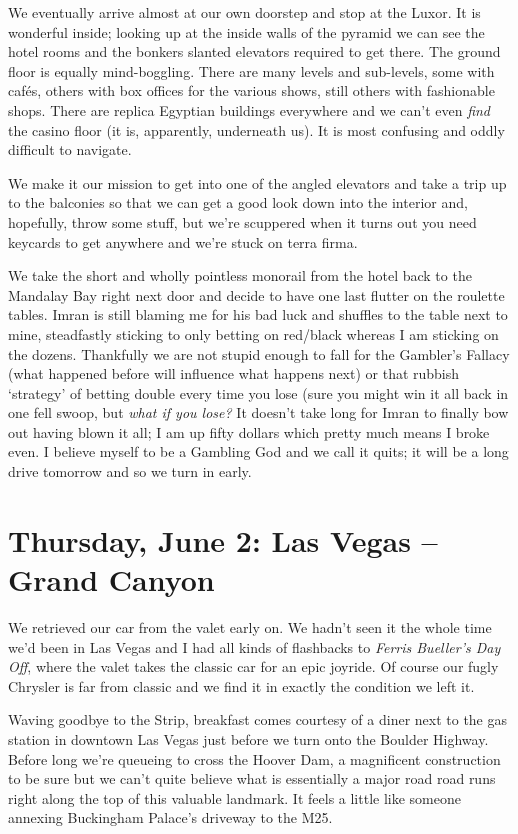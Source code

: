 \documentclass[a5paper,titlepage,11pt]{book}
\begin{document}
We eventually arrive almost at our own doorstep and stop at the Luxor.  It is wonderful inside; looking up at the inside walls of the pyramid we can see the hotel rooms and the bonkers slanted elevators required to get there.  The ground floor is equally mind-boggling.  There are many levels and sub-levels, some with caf\'{e}s, others with box offices for the various shows, still others with fashionable shops.  There are replica Egyptian buildings everywhere and we can't even \emph{find} the casino floor (it is, apparently, underneath us).  It is most confusing and oddly difficult to navigate.

We make it our mission to get into one of the angled elevators and take a trip up to the balconies so that we can get a good look down into the interior and, hopefully, throw some stuff, but we're scuppered when it turns out you need keycards to get anywhere and we're stuck on terra firma.

We take the short and wholly pointless monorail from the hotel back to the Mandalay Bay right next door and decide to have one last flutter on the roulette tables.  Imran is still blaming me for his bad luck and shuffles to the table next to mine, steadfastly sticking to only betting on red/black whereas I am sticking on the dozens.  Thankfully we are not stupid enough to fall for the Gambler's Fallacy (what happened before will influence what happens next) or that rubbish `strategy' of betting double every time you lose (sure you might win it all back in one fell swoop, but \emph{what if you lose?}  It doesn't take long for Imran to finally bow out having blown it all; I am up fifty dollars which pretty much means I broke even.  I believe myself to be a Gambling God and we call it quits; it will be a long drive tomorrow and so we turn in early.

\chapter[Las Vegas -- Grand Canyon]{Thursday, June 2: Las Vegas -- Grand Canyon}
We retrieved our car from the valet early on.  We hadn't seen it the whole time we'd been in Las Vegas and I had all kinds of flashbacks to \emph{Ferris Bueller's Day Off}, where the valet takes the classic car for an epic joyride.  Of course our fugly Chrysler is far from classic and we find it in exactly the condition we left it.

Waving goodbye to the Strip, breakfast comes courtesy of a diner next to the gas station in downtown Las Vegas just before we turn onto the Boulder Highway.  Before long we're queueing to cross the Hoover Dam, a magnificent construction to be sure but we can't quite believe what is essentially a major road road runs right along the top of this valuable landmark.  It feels a little like someone annexing Buckingham Palace's driveway to the M25.
\end{document}
